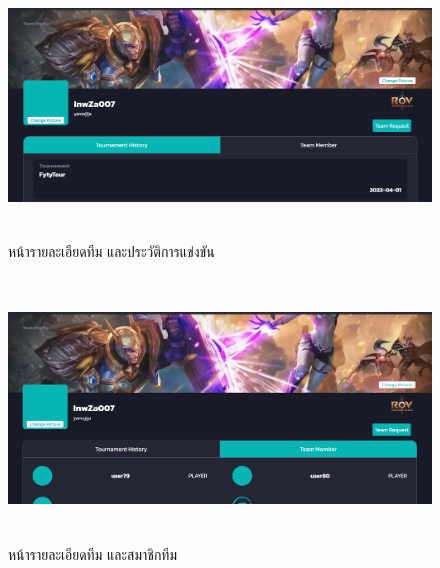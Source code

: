     \begin{figure}[ht]
      \begin{center}
      \includegraphics[width=18cm,height=7cm,keepaspectratio]{team_each_th.png}
      \end{center}
      \caption[หน้ารายละเอียดทีม และประวัติการแข่งขัน]{หน้ารายละเอียดทีม และประวัติการแข่งขัน}
      \label{fig:หน้ารายละเอียดทีม และประวัติการแข่งขัน}
    \end{figure}
    \begin{figure}[ht]
      \begin{center}
      \includegraphics[width=18cm,height=7cm,keepaspectratio]{team_each_tm.png}
      \end{center}
      \caption[หน้ารายละเอียดทีม และสมาชิกทีม]{หน้ารายละเอียดทีม และสมาชิกทีม}
      \label{fig:หน้ารายละเอียดทีม และสมาชิกทีม}
    \end{figure}
